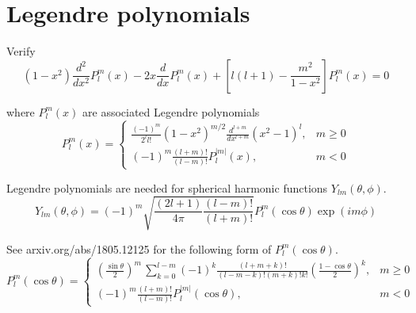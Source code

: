 

\section*{Legendre polynomials}

Verify
\begin{equation*}
(1-x^2)\frac{d^2}{dx^2}P_l^m(x)-2x\frac{d}{dx}P_l^m(x)+\left[l(l+1)-\frac{m^2}{1-x^2}\right]P_l^m(x)=0
\end{equation*}

where $P_l^m(x)$ are associated Legendre polynomials
\begin{equation*}
P_l^m(x)=\begin{cases}
\displaystyle
\frac{(-1)^m}{2^ll!}(1-x^2)^{m/2}\frac{d^{l+m}}{dx^{l+m}}(x^2-1)^l, & m\ge0
\\[3ex]
\displaystyle
(-1)^m\frac{(l+m)!}{(l-m)!}P_l^{|m|}(x), & m<0
\end{cases}
\end{equation*}

Legendre polynomials are needed for spherical harmonic functions $Y_{lm}(\theta,\phi)$.
\begin{equation*}
Y_{lm}(\theta,\phi)=(-1)^m\sqrt{\frac{(2l+1)}{4\pi}\frac{(l-m)!}{(l+m)!}}
P_l^m(\cos\theta)\exp(im\phi)
\end{equation*}

See arxiv.org/abs/1805.12125 for the following form of $P_l^m(\cos\theta)$.
\begin{equation*}
P_l^m(\cos\theta)=\begin{cases}
\displaystyle
\left(\frac{\sin\theta}{2}\right)^m\,\sum_{k=0}^{l-m}
(-1)^k\frac{(l+m+k)!}{(l-m-k)!(m+k)!k!}
\left(\frac{1-\cos\theta}{2}\right)^k, & m\ge0
\\[4ex]
\displaystyle
(-1)^m\frac{(l+m)!}{(l-m)!}P_l^{|m|}(\cos\theta), & m<0
\end{cases}
\end{equation*}


